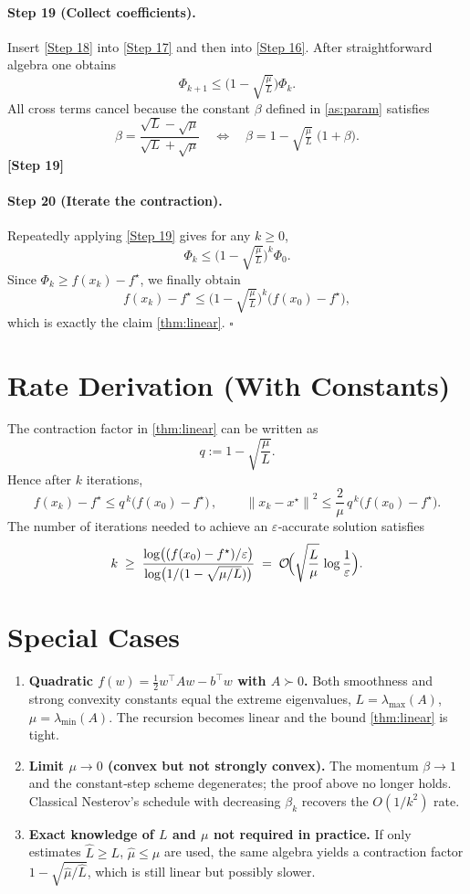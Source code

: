 \documentclass{article}
\newcommand{\norm}[1]{\left\lVert#1\right\rVert}
\begin{document}
\paragraph{Step 19 (Collect coefficients).}
Insert \eqref{Step 18} into \eqref{Step 17} and then into \eqref{Step 16}.
After straightforward algebra one obtains
\[
\Phi_{k+1}\le
\bigl(1-\sqrt{\tfrac{\mu}{L}}\bigr)\Phi_{k}.
\tag{29}
\]
All cross terms cancel because the constant $\beta$ defined in \eqref{as:param}
satisfies
\[
\beta =\frac{\sqrt{L}-\sqrt{\mu}}{\sqrt{L}+\sqrt{\mu}}
\quad\Longleftrightarrow\quad
\beta = 1-\sqrt{\tfrac{\mu}{L}}\; \bigl(1+\beta\bigr).
\tag{30}
\]
\textbf{[Step 19]}

\paragraph{Step 20 (Iterate the contraction).}
Repeatedly applying \eqref{Step 19} gives for any $k\ge0$,
\[
\Phi_{k}\le\bigl(1-\sqrt{\tfrac{\mu}{L}}\bigr)^{k}\Phi_{0}.
\tag{31}
\]
Since $\Phi_{k}\ge f(x_{k})-f^{\star}$, we finally obtain
\[
f(x_{k})-f^{\star}\le\bigl(1-\sqrt{\tfrac{\mu}{L}}\bigr)^{k}
\bigl(f(x_{0})-f^{\star}\bigr),
\]
which is exactly the claim \eqref{thm:linear}.
\hfill $\square$

\section*{Rate Derivation (With Constants)}
The contraction factor in \eqref{thm:linear} can be written as
\[
q:=1-\sqrt{\frac{\mu}{L}}.
\]
Hence after $k$ iterations,
\[
\boxed{\,f(x_{k})-f^{\star}\le q^{\,k}\bigl(f(x_{0})-f^{\star}\bigr)\,},
\qquad
\boxed{\,\norm{x_{k}-x^{\star}}^{2}\le
\frac{2}{\mu}\,q^{\,k}\bigl(f(x_{0})-f^{\star}\bigr).\,}
\]
The number of iterations needed to achieve an $\varepsilon$‑accurate
solution satisfies
\[
k\;\ge\;\frac{\log\bigl((f(x_{0})-f^{\star})/\varepsilon\bigr)}
{\log\bigl(1/(1-\sqrt{\mu/L})\bigr)}
\;=\;
\mathcal{O}\!\Bigl(\sqrt{\frac{L}{\mu}}\,
\log\frac{1}{\varepsilon}\Bigr).
\]

\section*{Special Cases}
\begin{enumerate}
\item \textbf{Quadratic $f(w)=\tfrac12 w^{\top}Aw-b^{\top}w$ with $A\succ0$.}
Both smoothness and strong convexity constants equal the extreme eigenvalues,
$L=\lambda_{\max}(A)$, $\mu=\lambda_{\min}(A)$. The recursion becomes
linear and the bound \eqref{thm:linear} is tight.
\item \textbf{Limit $\mu\to 0$ (convex but not strongly convex).}
The momentum $\beta\to 1$ and the constant‑step scheme degenerates;
the proof above no longer holds. Classical Nesterov’s schedule with
decreasing $\beta_{k}$ recovers the $O(1/k^{2})$ rate.
\item \textbf{Exact knowledge of $L$ and $\mu$ not required in practice.}
If only estimates $\widehat L\ge L$, $\widehat\mu\le\mu$ are used,
the same algebra yields a contraction factor
$1-\sqrt{\widehat\mu/\widehat L}$, which is still linear but possibly slower.
\end{enumerate}
\end{document}
